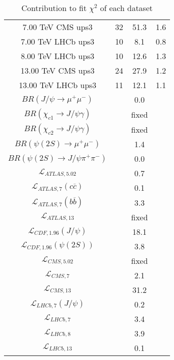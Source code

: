\begin{table}[h!]
\begin{tabular}{c|c|c|c}
7.00 TeV CMS ups3 & 32 & 51.3 & 1.6 \\
7.00 TeV LHCb ups3 & 10 & 8.1 & 0.8 \\
8.00 TeV LHCb ups3 & 10 & 12.6 & 1.3 \\
13.00 TeV CMS ups3 & 24 & 27.9 & 1.2 \\
13.00 TeV LHCb ups3 & 11 & 12.1 & 1.1 \\
\hline
$BR(J/\psi\rightarrow\mu^+\mu^-)$ &  & 0.0 &  \\
$BR(\chi_{c1}\rightarrow J/\psi\gamma)$ &  & fixed & \\
$BR(\chi_{c2}\rightarrow J/\psi\gamma)$ &  & fixed & \\
$BR(\psi(2S)\rightarrow\mu^+\mu^-)$ &  & 1.4 &  \\
$BR(\psi(2S)\rightarrow J/\psi\pi^+\pi^-)$ &  & 0.0 &  \\
$\mathcal L_{ATLAS,5.02}$ &  & 0.7 &  \\
$\mathcal L_{ATLAS,7}(c\overline c)$ &  & 0.1 &  \\
$\mathcal L_{ATLAS,7}(b\overline b)$ &  & 3.3 &  \\
$\mathcal L_{ATLAS,13}$ &  & fixed & \\
$\mathcal L_{CDF,1.96}(J/\psi)$ &  & 18.1 &  \\
$\mathcal L_{CDF,1.96}(\psi(2S))$ &  & 3.8 &  \\
$\mathcal L_{CMS,5.02}$ &  & fixed & \\
$\mathcal L_{CMS,7}$ &  & 2.1 &  \\
$\mathcal L_{CMS,13}$ &  & 31.2 &  \\
$\mathcal L_{LHCb,7}(J/\psi)$ &  & 0.2 &  \\
$\mathcal L_{LHCb,7}$ &  & 3.4 &  \\
$\mathcal L_{LHCb,8}$ &  & 3.9 &  \\
$\mathcal L_{LHCb,13}$ &  & 0.1 &  \\
\end{tabular}
\caption{Contribution to fit $\chi^2$ of each dataset}
\end{table}

